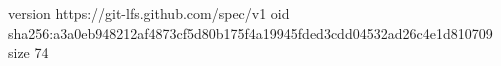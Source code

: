 version https://git-lfs.github.com/spec/v1
oid sha256:a3a0eb948212af4873cf5d80b175f4a19945fded3cdd04532ad26c4e1d810709
size 74
